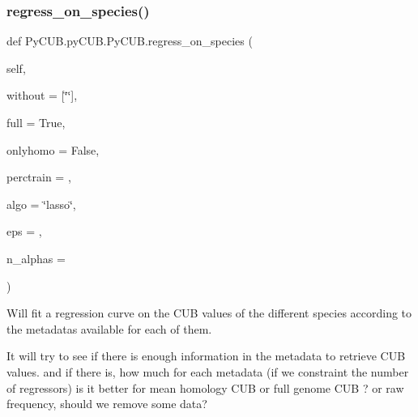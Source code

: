 \subsubsection{\texorpdfstring{regress\+\_\+on\+\_\+species()}{regress\_on\_species()}}
{\footnotesize\ttfamily def Py\+C\+U\+B.\+py\+C\+U\+B.\+Py\+C\+U\+B.\+regress\+\_\+on\+\_\+species (\begin{DoxyParamCaption}\item[{}]{self,  }\item[{}]{without = {\ttfamily \mbox{[}\char`\"{}\char`\"{}\mbox{]}},  }\item[{}]{full = {\ttfamily True},  }\item[{}]{onlyhomo = {\ttfamily False},  }\item[{}]{perctrain = {},  }\item[{}]{algo = {\ttfamily \char`\"{}lasso\char`\"{}},  }\item[{}]{eps = {},  }\item[{}]{n\+\_\+alphas = {} }\end{DoxyParamCaption})}



Will fit a regression curve on the C\+UB values of the different species according to the metadatas available for each of them. 

It will try to see if there is enough information in the metadata to retrieve C\+UB values. and if there is, how much for each metadata (if we constraint the number of regressors) is it better for mean homology C\+UB or full genome C\+UB ? or raw frequency, should we remove some data?


